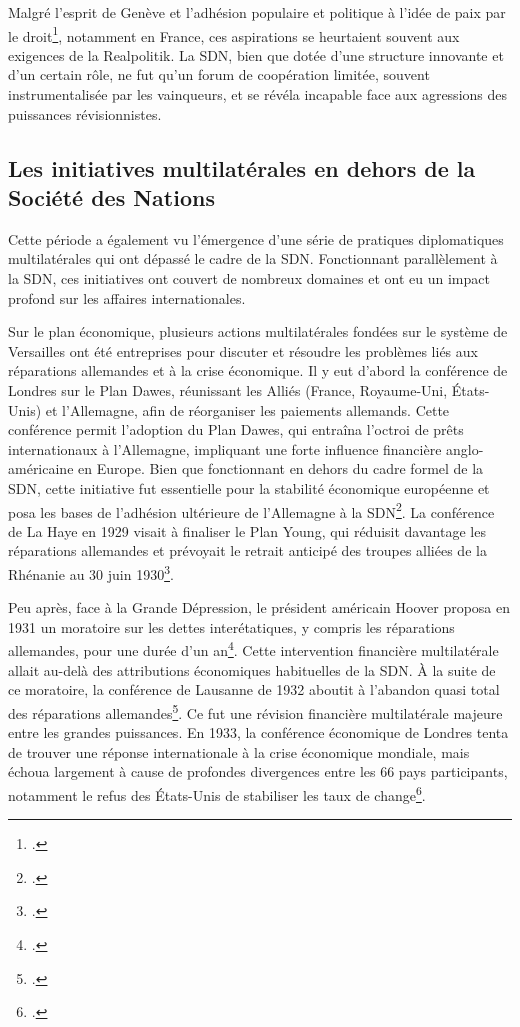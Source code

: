 \documentclass[a4paper,twoside,12pt]{book}
\begin{document}
Malgré l'esprit de Genève et l'adhésion populaire et politique à l'idée de paix par le droit\footcite[p.273]{guieu2016}, notamment en France, ces aspirations se heurtaient souvent aux exigences de la Realpolitik. La SDN, bien que dotée d'une structure innovante et d'un certain rôle, ne fut qu'un forum de coopération limitée, souvent instrumentalisée par les vainqueurs, et se révéla incapable face aux agressions des puissances révisionnistes.

\subsection{Les initiatives multilatérales en dehors de la Société des Nations}

Cette période a également vu l'émergence d'une série de pratiques diplomatiques multilatérales qui ont dépassé le cadre de la SDN. Fonctionnant parallèlement à la SDN, ces initiatives ont couvert de nombreux domaines et ont eu un impact profond sur les affaires internationales.

Sur le plan économique, plusieurs actions multilatérales fondées sur le système de Versailles ont été entreprises pour discuter et résoudre les problèmes liés aux réparations allemandes et à la crise économique. Il y eut d'abord la conférence de Londres sur le Plan Dawes, réunissant les Alliés (France, Royaume-Uni, États-Unis) et l'Allemagne, afin de réorganiser les paiements allemands. Cette conférence permit l'adoption du Plan Dawes, qui entraîna l'octroi de prêts internationaux à l'Allemagne, impliquant une forte influence financière anglo-américaine en Europe. Bien que fonctionnant en dehors du cadre formel de la SDN, cette initiative fut essentielle pour la stabilité économique européenne et posa les bases de l'adhésion ultérieure de l'Allemagne à la SDN\footcite[p.444-445]{guieu2016}. La conférence de La Haye en 1929 visait à finaliser le Plan Young, qui réduisit davantage les réparations allemandes et prévoyait le retrait anticipé des troupes alliées de la Rhénanie au 30 juin 1930\footcite[p.454]{guieu2016}.

Peu après, face à la Grande Dépression, le président américain Hoover proposa en 1931 un moratoire sur les dettes interétatiques, y compris les réparations allemandes, pour une durée d'un an\footcite[p.87]{montero2001}. Cette intervention financière multilatérale allait au-delà des attributions économiques habituelles de la SDN. À la suite de ce moratoire, la conférence de Lausanne de 1932 aboutit à l'abandon quasi total des réparations allemandes\footcite[p.87]{montero2001}. Ce fut une révision financière multilatérale majeure entre les grandes puissances. En 1933, la conférence économique de Londres tenta de trouver une réponse internationale à la crise économique mondiale, mais échoua largement à cause de profondes divergences entre les 66 pays participants, notamment le refus des États-Unis de stabiliser les taux de change\footcite[p.135]{milza2019}.
\end{document}

